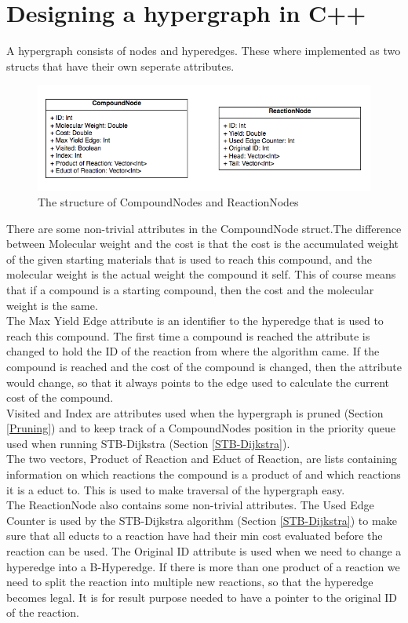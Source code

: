 \documentclass[a4paper,10pt,titlepage]{paper}
\begin{document}
\section{Designing a hypergraph in C++}
A hypergraph consists of nodes and hyperedges. These where implemented as two structs that have their own seperate attributes.
\begin{figure}[H]
\centering
\includegraphics[scale=0.5]{Billeder/Compound-ReactionNode.png}
\caption{The structure of CompoundNodes and ReactionNodes}
\end{figure}
There are some non-trivial attributes in the CompoundNode struct.The difference between Molecular weight and the cost is that the cost is the accumulated weight of the given starting materials that is used to reach this compound, and the molecular weight is the actual weight the compound it self. This of course means that if a compound is a starting compound, then the cost and the molecular weight is the same.\\ The Max Yield Edge attribute is an identifier to the hyperedge that is used to reach this compound. The first time a compound is reached the attribute is changed to hold the ID of the reaction from where the algorithm came. If the compound is reached and the cost of the compound is changed, then the attribute would change, so that it always points to the edge used to calculate the current cost of the compound.\\
Visited and Index are attributes used when the hypergraph is pruned (Section \ref{Pruning}) and to keep track of a CompoundNodes position in the priority queue used when running STB-Dijkstra (Section \ref{STB-Dijkstra}).\\
The two vectors, Product of Reaction and Educt of Reaction, are lists containing information on which reactions the compound is a product of and which reactions it is a educt to. This is used to make traversal of the hypergraph easy.\\

The ReactionNode also contains some non-trivial attributes. The Used Edge Counter is used by the STB-Dijkstra algorithm (Section \ref{STB-Dijkstra}) to make sure that all educts to a reaction have had their min cost evaluated before the reaction can be used. The Original ID attribute is used when we need to change a hyperedge into a B-Hyperedge. If there is more than one product of a reaction we need to split the reaction into multiple new reactions, so that the hyperedge becomes legal. It is for result purpose needed to have a pointer to the original ID of the reaction.\\
\end{document}
